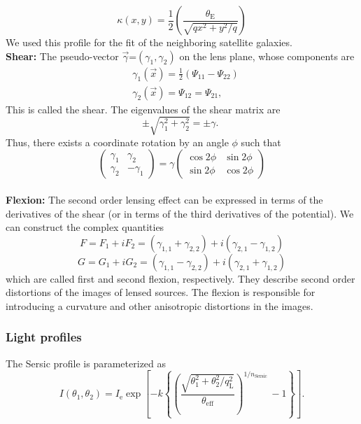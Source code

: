 \documentclass{aa}
\begin{document}
$$
\kappa\left(x, y\right)=\frac{1}{2}\left(\frac{\theta_{\mathrm{E}}}{\sqrt{q x^2+y^2 / q}}\right)
$$
We used this profile for the fit of the neighboring satellite galaxies.
\\
\newline
\textbf{Shear:} The pseudo-vector $\vec{\gamma}$=$(\gamma_1, \gamma_2)$ on the lens plane, whose components are
$$
\begin{aligned}
& \gamma_1(\vec{x})=\frac{1}{2}\left(\Psi_{11}-\Psi_{22}\right) \\
& \gamma_2(\vec{x})=\Psi_{12}=\Psi_{21},
\end{aligned}
$$
This is called the shear. The eigenvalues of the shear matrix are
$$
\pm \sqrt{\gamma_1^2+\gamma_2^2}= \pm \gamma \text {. }
$$
Thus, there exists a coordinate rotation by an angle $\phi$ such that
$$
\left(\begin{array}{cc}
\gamma_1 & \gamma_2 \\
\gamma_2 & -\gamma_1
\end{array}\right)=\gamma\left(\begin{array}{cc}
\cos 2 \phi & \sin 2 \phi \\
\sin 2 \phi & \cos 2 \phi
\end{array}\right)
$$
\\
\newline 
\textbf{Flexion:} The second order lensing effect can be expressed in terms of the derivatives of the shear (or in terms of the third derivatives of the potential). We can construct the complex quantities
$$
F= F_1 + iF_2 = \left(\gamma_{\mathrm{1,1}} + \gamma_{\mathrm{2,2}}\right) + i\left(\gamma_{\mathrm{2,1}} - \gamma_{\mathrm{1,2}}\right)
$$
$$
G= G_1 + iG_2 = \left(\gamma_{\mathrm{1,1}} - \gamma_{\mathrm{2,2}}\right) + i\left(\gamma_{\mathrm{2,1}} + \gamma_{\mathrm{1,2}}\right)
$$
which are called first and second flexion, respectively. They describe second order distortions of the images of lensed sources. The flexion is responsible for introducing a curvature and other anisotropic distortions
in the images.


\subsubsection{Light profiles}

The Sersic profile is parameterized as
$$
I\left(\theta_1, \theta_2\right)=I_{\mathrm{e}} \exp \left[-k\left\{\left(\frac{\sqrt{\theta_1^2+\theta_2^2 / q_{\mathrm{L}}^2}}{\theta_{\mathrm{eff}}}\right)^{1 / n_{\text {Sersic }}}-1\right\}\right] .
$$
\end{document}
